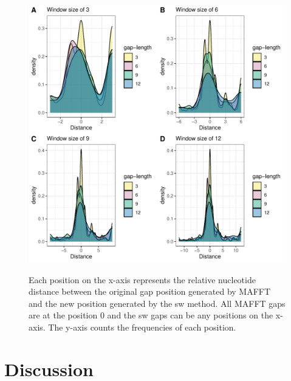 \begin{figure}[H]
     \centering
     \begin{minipage}[t]{1\textwidth }
     \includegraphics[width=1\linewidth]{Fig7.pdf}
     { {Each position on the x-axis represents the relative nucleotide distance between the original gap position generated by MAFFT and the new position generated by the sw method. All MAFFT gaps are at the position 0 and the sw gaps can be any positions on the x-axis. The y-axis counts the frequencies of each position.}  
 \par}
     \end{minipage}
\end{figure}

\section{Discussion}
